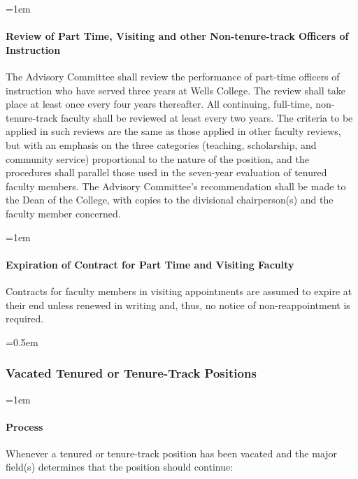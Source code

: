 \documentclass{manual}
\let\oldsubsubsection\subsubsection
\renewcommand\subsubsection{\leftskip=0.5em\oldsubsubsection}
\let\oldparagraph\paragraph
\renewcommand\paragraph{\leftskip=1em\oldparagraph}
\begin{document}
\paragraph{Review of Part Time, Visiting and other Non-tenure-track Officers of Instruction}\label{par:ReviewOfPartTimeVisitingAndOtherNonTenureTrackOfficersOfInstruction}
The Advisory Committee shall review the performance of part-time officers of instruction who have served three years at Wells College. The review shall take place at least once every four years thereafter. All continuing, full-time, non-tenure-track faculty shall be reviewed at least every two years. The criteria to be applied in such reviews are the same as those applied in other faculty reviews, but with an emphasis on the three categories (teaching, scholarship, and community service) proportional to the nature of the position, and the procedures shall parallel those used in the seven-year evaluation of tenured faculty members. The Advisory Committee's recommendation shall be made to the Dean of the College, with copies to the divisional chairperson(s) and the faculty member concerned.

\paragraph{Expiration of Contract for Part Time and Visiting Faculty}
Contracts for faculty members in visiting appointments are assumed to expire at their end unless renewed in writing and, thus, no notice of non-reappointment is required.

\subsubsection{Vacated Tenured or Tenure-Track Positions}

\paragraph{Process}

Whenever a tenured or tenure-track position has been vacated and the major field(s) determines that the position should continue:
\end{document}

